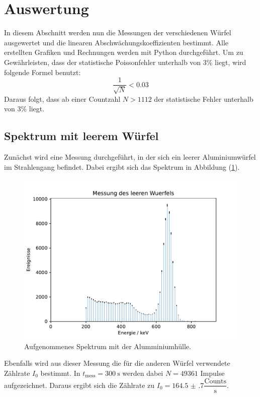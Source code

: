 \section{Auswertung}
\label{sec:Auswertung}
In diesem Abschnitt werden nun die Messungen der verschiedenen Würfel ausgewertet und die linearen Abschwächungskoeffizienten bestimmt.
Alle erstellten Grafiken und Rechnungen werden mit Python \cite{python} durchgeführt. Um zu Gewährleisten, dass der statistische Poissonfehler unterhalb von 3\% liegt, wird folgende Formel benutzt:
\begin{equation}
  \dfrac{1}{\sqrt{N}} < \num{0,03}
\end{equation}
Daraus folgt, dass ab einer Countzahl $N>1112$ der statistische Fehler unterhalb von 3\% liegt.
\subsection{Spektrum mit leerem Würfel}
Zunächst wird eine Messung durchgeführt, in der sich ein leerer Aluminiumwürfel im Strahlengang befindet. Dabei ergibt sich das Spektrum in Abbildung (\ref{fig:alu_leer}).
\begin{figure}
	\centering
	\includegraphics[scale=0.7]{fig/Alu_leer.pdf}
	\caption{Aufgenommenes Spektrum mit der Alumminiumhülle.}
	\label{fig:alu_leer}
\end{figure}
\FloatBarrier
\noindent Ebenfalls wird aus dieser Messung die für die anderen Würfel verwendete Zählrate $I_\mathrm{0}$ bestimmt. In $t_\mathrm{mess}=\SI{300}{\second}$ werden dabei $N=49361$ Impulse aufgezeichnet. Daraus ergibt sich die Zählrate zu $I_\mathrm{0}=\num{164.5(7)}\dfrac{\mathrm{Counts}}{\si{\second}}$.
